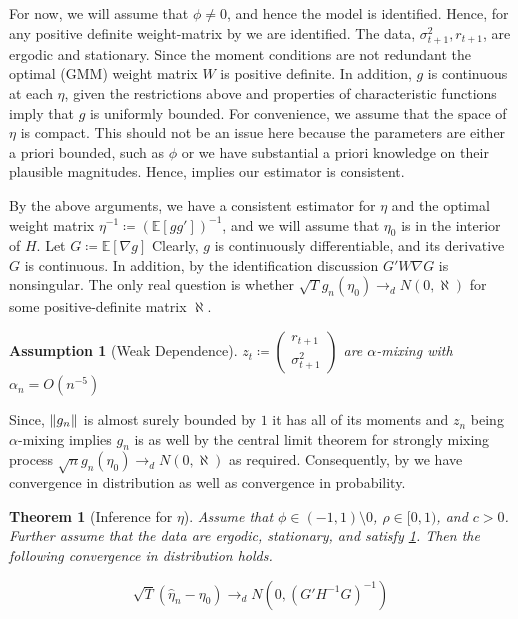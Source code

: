 \documentclass[11pt]{article}
\newtheorem{Theorem}{Theorem}[section]
\newtheorem{Assumption}{Assumption}[section]
\newcommand*{\E}{\mathbb{E}}
\newcommand*{\N}{N}
\newcommand*{\dto}{\ensuremath{\to_d}}
\newcommand*{\Eta}{H}
\DeclarePairedDelimiter\norm{\lVert}{\rVert}
\begin{document}
For now, we will assume that $\phi \neq 0$, and hence the model is identified.
Hence, for any positive definite weight-matrix by \textcite[Lemma 2.3]{newey1994large} we are identified.
The data, $\sigma^2_{t+1}, r_{t+1}$, are ergodic and stationary.
Since the moment conditions are not redundant the optimal (GMM) weight matrix $W$ is positive definite. 
In addition, $g$ is continuous at each $\eta$, given the restrictions above and properties of characteristic
functions imply that $g$ is uniformly bounded. 
For convenience, we assume that the space of $\eta$ is compact.
This should not be an issue here because the parameters  are either a priori bounded, such as $\phi$ or we have
substantial a priori knowledge on their plausible magnitudes.
Hence, \textcite[Theroem 2.6]{newey1994large} implies our estimator is consistent.

By the above arguments, we have a consistent estimator for $\eta$ and the optimal weight matrix $\eta^{-1}
\coloneqq (\E\left[g g'\right])^{-1}$, and we will assume that $\eta_0$ is in the interior of $\Eta$.
Let $G \coloneqq \E\left[\nabla g\right]$
Clearly, $g$ is continuously differentiable, and its derivative $G$ is continuous.
In addition, by the identification discussion $G' W \nabla G$ is nonsingular.
The only real question is whether $\sqrt{T} g_n(\eta_0) \dto \N(0, \aleph)$ for some positive-definite matrix
$\aleph$.

\begin{Assumption}[Weak Dependence]
    \label{assumption:weak_dependence}
    $z_t \coloneqq \begin{pmatrix} r_{t+1} \\ \sigma^2_{t+1} \end{pmatrix}$ are $\alpha$-mixing with $\alpha_n =
       O\left(n^{-5}\right)$
\end{Assumption}

Since, $\norm*{g_n}$ is almost surely bounded by $1$ it has all of its moments and $z_n$ being $\alpha$-mixing
implies $g_n$ is as well by the central limit theorem for strongly mixing process 
$\sqrt{n} g_n(\eta_0) \dto \N(0,\aleph)$ as required. 
Consequently, by \textcite[Theorem 3.2]{newey1994large} we have convergence in distribution as well as convergence
in probability.

\begin{Theorem}[Inference for $\eta$]
    Assume that $\phi  \in (-1,1) \setminus 0$, $\rho \in [0,1)$, and $c > 0$. 
    Further assume that the data are ergodic, stationary, and satisfy \cref{assumption:weak_dependence}.
    Then the following convergence in distribution holds.

    \begin{equation}
        \sqrt{T} (\widehat{\eta}_n - \eta_{0}) \dto \N\left(0, \left(G' \Eta^{-1} G\right)^{-1}\right)
    \end{equation}
\end{Theorem}
\end{document}
